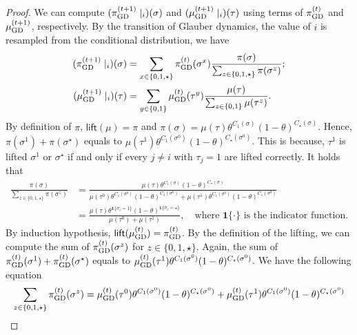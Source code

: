 \documentclass[11pt,a4paper]{article}
\theoremstyle{definition}
\def\*#1{\mathbf{#1}} %
\begin{document}
\begin{proof}
    We can compute $(\pi^{(t+1)}_{\textnormal{GD}}\mid_i)(\sigma)$ and $(\mu^{(t+1)}_{\textnormal{GD}}\mid_i)(\tau)$ using terms of $\pi^{(t)}_{\textnormal{GD}}$ and $\mu^{(t+1)}_{\textnormal{GD}}$, respectively. By the transition of Glauber dynamics, the value of $i$ is resampled from the conditional distribution, we have
    \begin{align}\label{eq:update-pi-mu}
    \begin{split}
     (\pi^{(t+1)}_{\textnormal{GD}}\mid_i)(\sigma) &= \sum_{x\in \{0,1,\star\}}\pi^{(t)}_{\textnormal{GD}}(\sigma^x)\frac{\pi(\sigma)}{\sum_{z\in \{0,1,\star\}}\pi(\sigma^z)};\\
    (\mu^{(t+1)}_{\textnormal{GD}}\mid_i)(\tau) &= \sum_{y\in \{0,1\}}\mu^{(t)}_{\textnormal{GD}}(\tau^y)\frac{\mu(\tau)}{\sum_{z\in \{0,1\}}\mu(\tau^z)}.   
    \end{split}
    \end{align}
    By definition of $\pi$, $\textsf{lift}(\mu)=\pi$ and $\pi(\sigma) = \mu(\tau)\theta^{C_1(\sigma)}(1-\theta)^{C_\star(\sigma)}$. Hence, $\pi(\sigma^1) + \pi(\sigma^\star)$ equals to $\mu(\tau^1) \theta^{C_1(\sigma^0)}(1-\theta)^{C_\star(\sigma^0)}$. This is because, $\tau^1$ is lifted $\sigma^1$ or $\sigma^\star$ if and only if every $j \neq i$ with $\tau_j = 1$ are lifted correctly.
    It holds that
    \begin{align*}
    \frac{\pi(\sigma)}{\sum_{z\in \{0,1,\star\}}\pi(\sigma^z)} &=\frac{\mu(\tau)\theta^{C_1(\sigma)}(1-\theta)^{C_\star(\sigma)}}{\mu(\tau^0)\theta^{C_1(\sigma^0)}(1-\theta)^{C_\star(\sigma^0)}+\mu(\tau^1)\theta^{C_1(\sigma^0)}(1-\theta)^{C_\star(\sigma^0)}}\\
    &=\frac{\mu(\tau)\theta^{\*1\{\sigma_i=1\}} (1-\theta)^{\*1\{\sigma_i=\star\}}}{\mu(\tau^0)+\mu(\tau^1)},\quad \text{where $\*1\{\cdot\}$ is the indicator function.}
    \end{align*}
    By induction hypothesis, $\textsf{lift}(\mu^{(t)}_{\textnormal{GD}})=\pi^{(t)}_{\textnormal{GD}}$. By the definition of the lifting, we can compute the sum of $\pi^{(t)}_{\textnormal{GD}}(\sigma^z)$ for $z\in \{0,1,\star\}$. Again, the sum of $\pi^{(t)}_{\textnormal{GD}}(\sigma^1) + \pi^{(t)}_{\textnormal{GD}}(\sigma^\star)$ equals to $\mu^{(t)}_{\textnormal{GD}}(\tau^1) \theta^{C_1(\sigma^0)}(1-\theta)^{C_\star(\sigma^0)}$. We have the following equation
    \begin{align*}
    \sum_{z\in \{0,1,\star\}}\pi^{(t)}_{\textnormal{GD}}(\sigma^z)&=\mu^{(t)}_{\textnormal{GD}}(\tau^0)\theta^{C_1(\sigma^0)}(1-\theta)^{C_\star(\sigma^0)}+\mu^{(t)}_{\textnormal{GD}}(\tau^1)\theta^{C_1(\sigma^0)}(1-\theta)^{C_\star(\sigma^0)}\\

\end{align*}
\end{proof}
\end{document}
